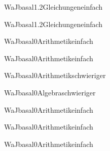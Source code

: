 \documentclass[12pt]{article}
\begin{document}
\begin{Add}{WaJ}{basal1.2}{Gleichungen}{einfach}
\end{Add}

\begin{Add}{WaJ}{basal1.2}{Gleichungen}{einfach}
\end{Add}

\begin{Add}{WaJ}{basal0}{Arithmetik}{einfach}
\end{Add}

\begin{Add}{WaJ}{basal0}{Arithmetik}{einfach}
\end{Add}

\begin{Add}{WaJ}{basal0}{Arithmetik}{schwieriger}
\end{Add}

\begin{Add}{WaJ}{basal0}{Algebra}{schwieriger}
\end{Add}

\begin{Add}{WaJ}{basal0}{Arithmetik}{einfach}
\end{Add}

\begin{Add}{WaJ}{basal0}{Arithmetik}{einfach}
\end{Add}

\begin{Add}{WaJ}{basal0}{Arithmetik}{einfach}
\end{Add}
\end{document}
